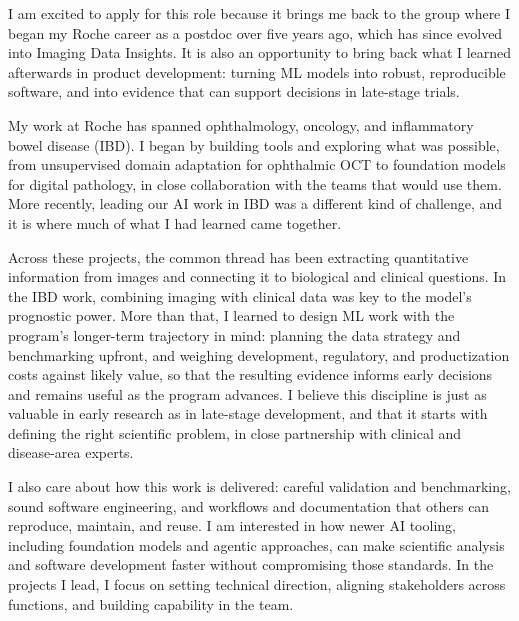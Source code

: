 \documentclass[10pt, letter]{ag-cv} %
\begin{document}
\makecvheader %

\makelettertitlenorec %


\begin{cvletter}


\begin{flushleft}

I am excited to apply for this role because it brings me back to the group where I began my Roche career as a postdoc over five years ago, which has since evolved into Imaging Data Insights. It is also an opportunity to bring back what I learned afterwards in product development: turning ML models into robust, reproducible software, and into evidence that can support decisions in late-stage trials.

My work at Roche has spanned ophthalmology, oncology, and inflammatory bowel disease (IBD). I began by building tools and exploring what was possible, from unsupervised domain adaptation for ophthalmic OCT to foundation models for digital pathology, in close collaboration with the teams that would use them. More recently, leading our AI work in IBD was a different kind of challenge, and it is where much of what I had learned came together. 

Across these projects, the common thread has been extracting quantitative information from images and connecting it to biological and clinical questions.
In the IBD work, combining imaging with clinical data was key to the model's prognostic power. More than that, I learned to design ML work with the program's longer-term trajectory in mind: planning the data strategy and benchmarking upfront, and weighing development, regulatory, and productization costs against likely value, so that the resulting evidence informs early decisions and remains useful as the program advances. I believe this discipline is just as valuable in early research as in late-stage development, and that it starts with defining the right scientific problem, in close partnership with clinical and disease-area experts.

I also care about how this work is delivered: careful validation and benchmarking, sound software engineering, and workflows and documentation that others can reproduce, maintain, and reuse. I am interested in how newer AI tooling, including foundation models and agentic approaches, can make scientific analysis and software development faster without compromising those standards. In the projects I lead, I focus on setting technical direction, aligning stakeholders across functions, and building capability in the team.


\end{flushleft}
\end{cvletter}
\end{document}
